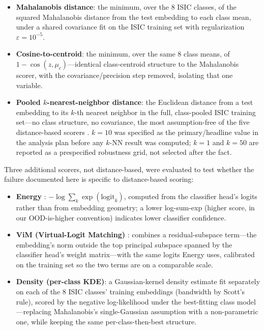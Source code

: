 \begin{itemize}
\item \textbf{Mahalanobis distance}: the minimum, over the 8 ISIC classes, of the squared Mahalanobis distance from the test embedding to each class mean, under a shared covariance fit on the ISIC training set with regularization $\varepsilon=10^{-5}$.
\item \textbf{Cosine-to-centroid}: the minimum, over the same 8 class means, of $1-\cos(z,\mu_c)$---identical class-centroid structure to the Mahalanobis scorer, with the covariance/precision step removed, isolating that one variable.
\item \textbf{Pooled $k$-nearest-neighbor distance}: the Euclidean distance from a test embedding to its $k$-th nearest neighbor in the full, class-pooled ISIC training set---no class structure, no covariance, the most assumption-free of the five distance-based scorers \citep{sun2022out}. $k=10$ was specified as the primary/headline value in the analysis plan before any $k$-NN result was computed; $k=1$ and $k=50$ are reported as a prespecified robustness grid, not selected after the fact.
\end{itemize}

Three additional scorers, not distance-based, were evaluated to test whether the failure documented here is specific to distance-based scoring:

\begin{itemize}
\item \textbf{Energy} \citep{liu2020energy}: $-\log\sum_k\exp(\text{logit}_k)$, computed from the classifier head's logits rather than from embedding geometry; a lower log-sum-exp (higher score, in our OOD-is-higher convention) indicates lower classifier confidence.
\item \textbf{ViM (Virtual-Logit Matching)} \citep{wang2022vim}: combines a residual-subspace term---the embedding's norm outside the top principal subspace spanned by the classifier head's weight matrix---with the same logits Energy uses, calibrated on the training set so the two terms are on a comparable scale.
\item \textbf{Density (per-class KDE)}: a Gaussian-kernel density estimate fit separately on each of the 8 ISIC classes' training embeddings (bandwidth by Scott's rule), scored by the negative log-likelihood under the best-fitting class model---replacing Mahalanobis's single-Gaussian assumption with a non-parametric one, while keeping the same per-class-then-best structure.
\end{itemize}

